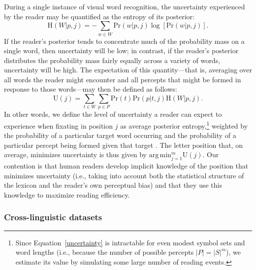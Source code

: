 \documentclass[doc,biblatex,floatsintext]{apa7}
\begin{document}
During a single instance of visual word recognition, the uncertainty experienced by the reader may be quantified as the entropy of its posterior:
\begin{equation}
\mathrm{H}(W|p,j) = -\sum_{w \in W} \mathrm{Pr}(w|p,j) \log [\mathrm{Pr}(w|p,j)].
\label{entropy}
\end{equation}
If the reader's posterior tends to concentrate much of the probability mass on a single word, then uncertainty will be low; in contrast, if the reader's posterior distributes the probability mass fairly equally across a variety of words, uncertainty will be high. The expectation of this quantity---that is, averaging over all words the reader might encounter and all percepts that might be formed in response to those words---may then be defined as follows:
\begin{equation}
\mathrm{U}(j) = \sum_{t \in W} \sum_{p \in P} \mathrm{Pr}(t) \mathrm{Pr}(p|t,j) \mathrm{H}(W|p,j).
\label{uncertainty}
\end{equation}
In other words, we define the level of uncertainty a reader can expect to experience when fixating in position $j$ as average posterior entropy,\footnote{Since Equation~\ref{uncertainty} is intractable for even modest symbol sets and word lengths (i.e., because the number of possible percepts $|P| = |S|^m$), we estimate its value by simulating some large number of reading events.} weighted by the probability of a particular target word occurring and the probability of a particular percept being formed given that target \parencite[see][for another approach]{Alhama:2019}. The letter position that, on average, minimizes uncertainty is thus given by $\mathrm{arg\,min}_{j=1}^m \mathrm{U}(j)$. Our contention is that human readers develop implicit knowledge of the position that minimizes uncertainty (i.e., taking into account both the statistical structure of the lexicon and the reader's own perceptual bias) and that they use this knowledge to maximize reading efficiency.

\subsubsection{Cross-linguistic datasets}
\end{document}
